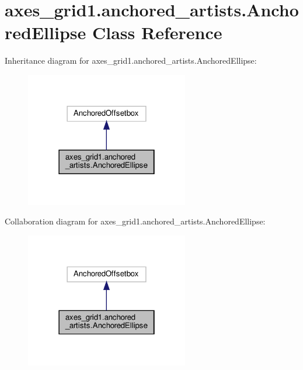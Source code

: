 \hypertarget{classaxes__grid1_1_1anchored__artists_1_1AnchoredEllipse}{}\section{axes\+\_\+grid1.\+anchored\+\_\+artists.\+Anchored\+Ellipse Class Reference}
\label{classaxes__grid1_1_1anchored__artists_1_1AnchoredEllipse}


Inheritance diagram for axes\+\_\+grid1.\+anchored\+\_\+artists.\+Anchored\+Ellipse\+:
\nopagebreak
\begin{figure}[H]
\begin{center}
\leavevmode
\includegraphics[width=202pt]{classaxes__grid1_1_1anchored__artists_1_1AnchoredEllipse__inherit__graph}
\end{center}
\end{figure}


Collaboration diagram for axes\+\_\+grid1.\+anchored\+\_\+artists.\+Anchored\+Ellipse\+:
\nopagebreak
\begin{figure}[H]
\begin{center}
\leavevmode
\includegraphics[width=202pt]{classaxes__grid1_1_1anchored__artists_1_1AnchoredEllipse__coll__graph}
\end{center}
\end{figure}
